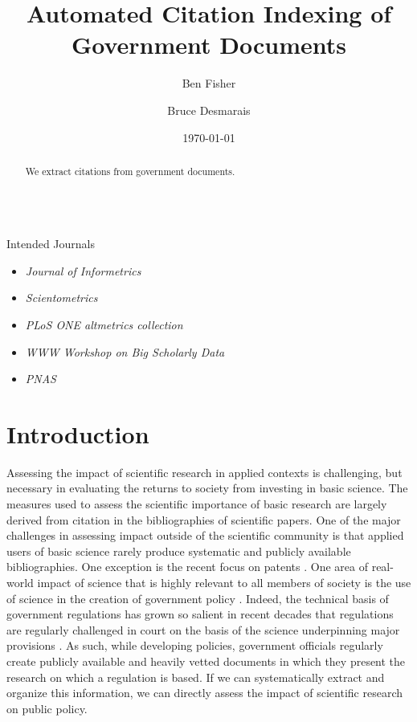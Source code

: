 \documentclass[12pt]{article}
\title{\vspace{-2cm} Automated Citation Indexing of Government Documents}
\author{ Ben Fisher \and Bruce Desmarais} \date{\today}
\begin{document}
\maketitle


\begin{abstract}

 \noindent  We extract citations from government documents. \\~\\

\end{abstract}

Intended Journals \begin{itemize}
\item {\em Journal of Informetrics}
\item {\em Scientometrics}
\item {\em PLoS ONE altmetrics collection}
\item {\em WWW Workshop on Big Scholarly Data}
\item {\em PNAS}
\end{itemize}

\thispagestyle{empty}
\newpage
\doublespacing


\section{Introduction}
Assessing the impact of scientific research in applied contexts is challenging, but necessary in evaluating the returns to society from investing in basic science. The measures used to assess the scientific importance of basic research are largely derived from citation in the bibliographies of scientific papers. One of the major challenges in assessing impact outside of the scientific community is that applied users of basic science rarely produce systematic and publicly available bibliographies. One exception is the recent focus on patents \cite{huang2014,liaw2014,huang2015,wong2015}. One area of real-world impact of science that is highly relevant to all members of society is the use of science in the creation of government policy \cite{nrc2012}. Indeed, the technical basis of government regulations has grown so salient in recent decades that regulations are regularly challenged in court on the basis of the science underpinning major provisions \cite{ellig2013,morrall2014}. As such, while developing policies, government officials regularly create publicly available and heavily vetted documents in which they present the research on which a regulation is based. If we can systematically extract and organize this information, we can directly assess the impact of scientific research on public policy.
\end{document}

